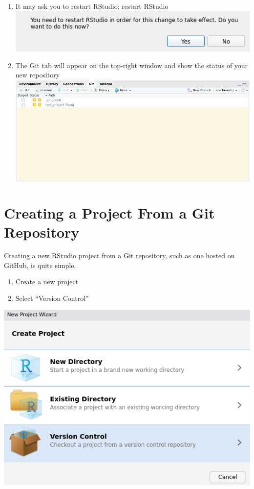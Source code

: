 \documentclass[
]{book}
\providecommand{\tightlist}{%
  \setlength{\itemsep}{0pt}\setlength{\parskip}{0pt}}
\begin{document}
\begin{enumerate}
\item
  It may ask you to restart RStudio; restart RStudio
  \includegraphics{images/02-newgit_5.png}
\item
  The Git tab will appear on the top-right window and show the status of your new repository
  \includegraphics{images/02-newgit_6.png}
\end{enumerate}

\hypertarget{creating-a-project-from-a-git-repository}{%
\section{Creating a Project From a Git Repository}\label{creating-a-project-from-a-git-repository}}

Creating a new RStudio project from a Git repository, such as one hosted on GitHub, is quite simple.

\begin{enumerate}
\def\labelenumi{\arabic{enumi}.}
\tightlist
\item
  Create a new project
\item
  Select ``Version Control''
\end{enumerate}

\includegraphics{images/02-newprojectgit_1.png}
\end{document}
